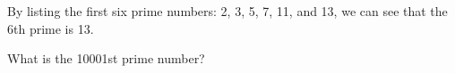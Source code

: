 
\begin{ProjectEuler}{7}
By listing the first six prime numbers: 2, 3, 5, 7, 11, and 13, we can see that the 6th prime is 13. \medskip

\noindent What is the \num{10 001}st prime number?
\end{ProjectEuler}
